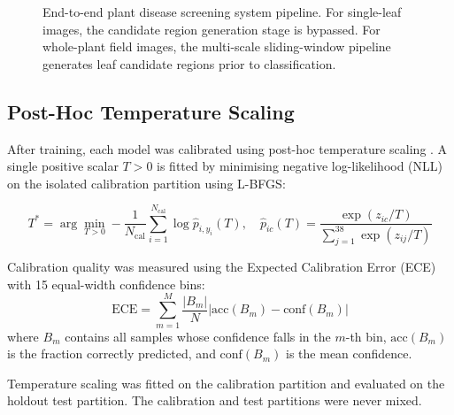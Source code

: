 \documentclass[pdflatex,sn-mathphys-num]{sn-jnl}
\begin{document}
\begin{figure}[H]
  \centering
  \caption{End-to-end plant disease screening system pipeline. For single-leaf images,
  the candidate region generation stage is bypassed. For whole-plant field images, the
  multi-scale sliding-window pipeline generates leaf candidate regions prior to
  classification.}
  \label{fig:pipeline}
\end{figure}

\subsection{Post-Hoc Temperature Scaling}
\label{sec:calibration_method}

After training, each model was calibrated using post-hoc temperature scaling
\citep{guo2017calibration}. A single positive scalar $T > 0$ is fitted by minimising
negative log-likelihood (NLL) on the isolated calibration partition using L-BFGS:

\begin{equation}
  T^* = \arg\min_{T > 0} -\frac{1}{N_{\text{cal}}} \sum_{i=1}^{N_{\text{cal}}}
  \log \hat{p}_{i, y_i}(T),
  \quad \hat{p}_{ic}(T) = \frac{\exp(z_{ic}/T)}{\sum_{j=1}^{38} \exp(z_{ij}/T)}
  \label{eq:temperature_scaling}
\end{equation}

Calibration quality was measured using the Expected Calibration Error (ECE) with 15
equal-width confidence bins:
\begin{equation}
  \text{ECE} = \sum_{m=1}^{M} \frac{|B_m|}{N}
  \left|\text{acc}(B_m) - \text{conf}(B_m)\right|
  \label{eq:ece}
\end{equation}
where $B_m$ contains all samples whose confidence falls in the $m$-th bin,
$\text{acc}(B_m)$ is the fraction correctly predicted, and $\text{conf}(B_m)$ is the
mean confidence.

Temperature scaling was fitted on the calibration partition and evaluated on the
holdout test partition. The calibration and test partitions were never mixed.
\end{document}
